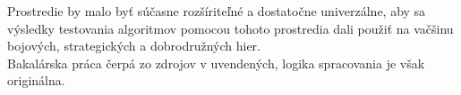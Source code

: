 \indent Prostredie by malo byť súčasne rozšíriteľné a dostatočne univerzálne, aby sa výsledky testovania algoritmov pomocou tohoto prostredia dali použiť na vačšinu bojových, strategických a dobrodružných hier. \\
\indent Bakalárska práca čerpá zo zdrojov v uvendených, logika spracovania je však originálna.
